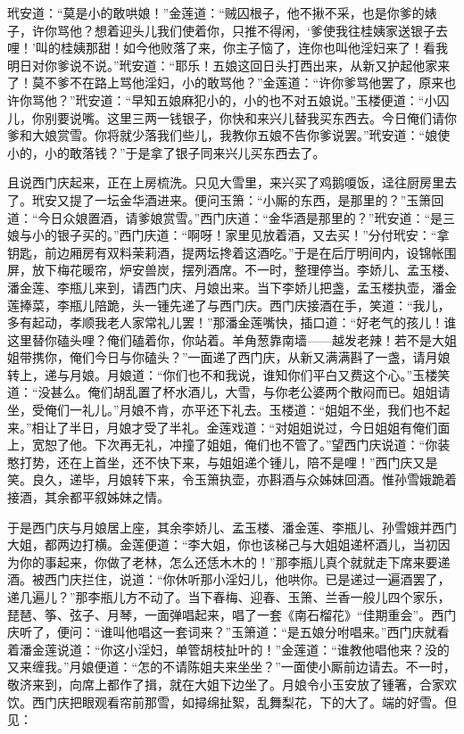 玳安道：“莫是小的敢哄娘！”金莲道：“贼囚根子，他不揪不采，也是你爹的婊子，许你骂他？想着迎头儿我们使着你，只推不得闲，‘爹使我往桂姨家送银子去哩！’叫的桂姨那甜！如今他败落了来，你主子恼了，连你也叫他淫妇来了！看我明日对你爹说不说。”玳安道：“耶乐！五娘这回日头打西出来，从新又护起他家来了！莫不爹不在路上骂他淫妇，小的敢骂他？”金莲道：“许你爹骂他罢了，原来也许你骂他？”玳安道：“早知五娘麻犯小的，小的也不对五娘说。”玉楼便道：“小囚儿，你别要说嘴。这里三两一钱银子，你快和来兴儿替我买东西去。今日俺们请你爹和大娘赏雪。你将就少落我们些儿，我教你五娘不告你爹说罢。”玳安道：“娘使小的，小的敢落钱？”于是拿了银子同来兴儿买东西去了。

且说西门庆起来，正在上房梳洗。只见大雪里，来兴买了鸡鹅嗄饭，迳往厨房里去了。玳安又提了一坛金华酒进来。便问玉箫：“小厮的东西，是那里的？”玉箫回道：“今日众娘置酒，请爹娘赏雪。”西门庆道：“金华酒是那里的？”玳安道：“是三娘与小的银子买的。”西门庆道：“啊呀！家里见放着酒，又去买！”分付玳安：“拿钥匙，前边厢房有双料茉莉酒，提两坛搀着这酒吃。”于是在后厅明间内，设锦帐围屏，放下梅花暖帘，炉安兽炭，摆列酒席。不一时，整理停当。李娇儿、孟玉楼、潘金莲、李瓶儿来到，请西门庆、月娘出来。当下李娇儿把盏，孟玉楼执壶，潘金莲捧菜，李瓶儿陪跪，头一锺先递了与西门庆。西门庆接酒在手，笑道：“我儿，多有起动，孝顺我老人家常礼儿罢！”那潘金莲嘴快，插口道：“好老气的孩儿！谁这里替你磕头哩？俺们磕着你，你站着。羊角葱靠南墙——越发老辣！若不是大姐姐带携你，俺们今日与你磕头？”一面递了西门庆，从新又满满斟了一盏，请月娘转上，递与月娘。月娘道：“你们也不和我说，谁知你们平白又费这个心。”玉楼笑道：“没甚么。俺们胡乱置了杯水酒儿，大雪，与你老公婆两个散闷而已。姐姐请坐，受俺们一礼儿。”月娘不肯，亦平还下礼去。玉楼道：“姐姐不坐，我们也不起来。”相让了半日，月娘才受了半礼。金莲戏道：“对姐姐说过，今日姐姐有俺们面上，宽恕了他。下次再无礼，冲撞了姐姐，俺们也不管了。”望西门庆说道：“你装憨打势，还在上首坐，还不快下来，与姐姐递个锺儿，陪不是哩！”西门庆又是笑。良久，递毕，月娘转下来，令玉箫执壶，亦斟酒与众姊妹回酒。惟孙雪娥跪着接酒，其余都平叙姊妹之情。

于是西门庆与月娘居上座，其余李娇儿、孟玉楼、潘金莲、李瓶儿、孙雪娥并西门大姐，都两边打横。金莲便道：“李大姐，你也该梯己与大姐姐递杯酒儿，当初因为你的事起来，你做了老林，怎么还恁木木的！”那李瓶儿真个就就走下席来要递酒。被西门庆拦住，说道：“你休听那小淫妇儿，他哄你。已是递过一遍酒罢了，递几遍儿？”那李瓶儿方不动了。当下春梅、迎春、玉箫、兰香一般儿四个家乐，琵琶、筝、弦子、月琴，一面弹唱起来，唱了一套《南石榴花》“佳期重会”。西门庆听了，便问：“谁叫他唱这一套词来？”玉箫道：“是五娘分咐唱来。”西门庆就看着潘金莲说道：“你这小淫妇，单管胡枝扯叶的！”金莲道：“谁教他唱他来？没的又来缠我。”月娘便道：“怎的不请陈姐夫来坐坐？”一面使小厮前边请去。不一时，敬济来到，向席上都作了揖，就在大姐下边坐了。月娘令小玉安放了锺箸，合家欢饮。西门庆把眼观看帘前那雪，如撏绵扯絮，乱舞梨花，下的大了。端的好雪。但见：

